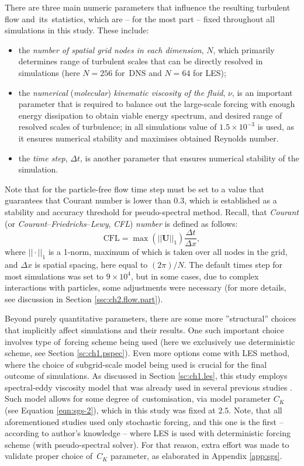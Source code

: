 \documentclass{pracamgren}
\begin{document}
There are three main numeric parameters that influence the resulting turbulent flow and~its~statistics, which are -- for the most part -- fixed throughout all simulations in this study.
These include:
\begin{itemize}
\item the \emph{number of spatial grid nodes in each dimension}, $N$, which primarily determines range of turbulent scales that can be directly resolved in simulations (here $N=256$ for~DNS and $N=64$ for LES);
\item the \emph{numerical} (\emph{molecular}) \emph{kinematic viscosity of the fluid}, $\nu$, is an important parameter that is required to balance out the large-scale forcing with enough energy dissipation to obtain viable energy spectrum, and desired range of resolved scales of turbulence; in all simulations value of $1.5 \times 10^{-3}$ is used, as it ensures numerical stability and maximises obtained Reynolds number.
\item the \emph{time step}, $\Delta t$, is another parameter that ensures numerical stability of the simulation.
\end{itemize}
Note that for the particle-free flow time step must be set to a value that guarantees that Courant number is lower than $0.3$, which is established as a stability and accuracy threshold for pseudo-spectral method.
Recall, that \emph{Courant} (or \emph{Courant}--\emph{Friedrichs}--\emph{Lewy}, \emph{CFL}) \emph{number} is defined as follows:
$$ \text{CFL} = \max ( || \mathbf{U} ||_1 ) \frac{\Delta t}{\Delta x} , $$
where $|| \cdot ||_1$ is a 1-norm, maximum of which is taken over all nodes in the grid, and $\Delta x$ is spatial spacing, here equal to $(2 \pi) / N$. 
The default times step for most simulations was set to $9 \times 10^{4}$, but in some cases, due to complex interactions with particles, some adjustments were necessary (for more details, see discussion in Section \ref{ssc:ch2.flow.part}).

Beyond purely quantitative parameters, there are some more ''structural'' choices that implicitly affect simulations and their results.
One such important choice involves type of~forcing scheme being used (here we exclusively use deterministic scheme, see Section \ref{sc:ch1.pspec}).
Even more options come with LES method, where the choice of subgrid-scale model being used is crucial for the final outcome of simulations.
As discussed in Section \ref{sc:ch1.les}, this study employs spectral-eddy viscosity model that was already used in several previous studies \parencite{Yang2008, Jin2010, Rosa2017}.
Such model allows for some degree of~customisation, via model parameter $C_K$ (see Equation \ref{eqn:sgs-2}), which in this study was fixed at $2.5$.
Note, that all aforementioned studies used only stochastic forcing, and this one is the first -- according to author's knowledge -- where LES is used with deterministic forcing scheme (with pseudo-spectral solver).
For that reason, extra effort was made to validate proper choice of~$C_K$ parameter, as elaborated in Appendix \ref{app:sgs}. 
\end{document}
